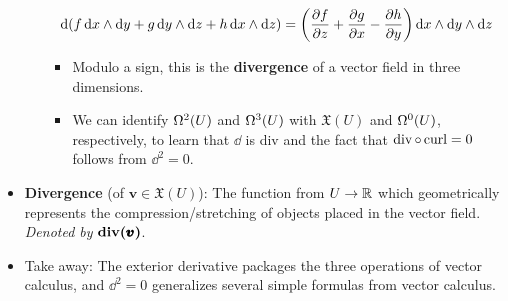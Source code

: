 \documentclass[../notes.tex]{subfiles}
\begin{document}
\begin{itemize}
\begin{itemize}
        \begin{equation*}
            \dd(f\dd{x}\wedge\dd{y}+g\dd{y}\wedge\dd{z}+h\dd{x}\wedge\dd{z}) = \left( \pdv{f}{z}+\pdv{g}{x}-\pdv{h}{y} \right)\dd{x}\wedge\dd{y}\wedge\dd{z}
        \end{equation*}
        \begin{itemize}
            \item Modulo a sign, this is the \textbf{divergence} of a vector field in three dimensions.
            \item We can identify $\ome[2]{U}$ and $\ome[3]{U}$ with $\mathfrak{X}(U)$ and $\ome[0]{U}$, respectively, to learn that $\dd$ is div and the fact that $\dvv\circ\crl=0$ follows from $\dd^2=0$.
        \end{itemize}
    \end{itemize}
    \item \textbf{Divergence} (of $\bm{v}\in\mathfrak{X}(U)$): The function from $U\to\R$ which geometrically represents the compression/stretching of objects placed in the vector field. \emph{Denoted by} $\bm{\dvv(\pmb{v})}$.
    \item Take away: The exterior derivative packages the three operations of vector calculus, and $\dd^2=0$ generalizes several simple formulas from vector calculus.
\end{itemize}
\end{document}
